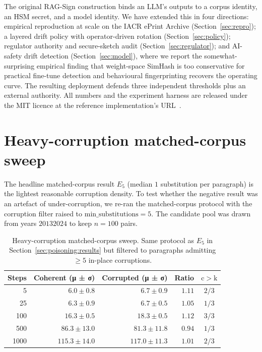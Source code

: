 \documentclass[11pt,a4paper]{article}
\begin{document}
The original RAG\nobreakdash-Sign construction \cite{holmes2025ragsign}
binds an LLM's outputs to a corpus identity, an HSM secret, and a
model identity.  We have extended this in four directions:
empirical reproduction at scale on the IACR ePrint Archive
(Section~\ref{sec:repro}); a layered drift policy with operator\nobreakdash-driven
rotation (Section~\ref{sec:policy}); regulator authority and
secure\nobreakdash-sketch audit (Section~\ref{sec:regulator}); and
AI\nobreakdash-safety drift detection (Section~\ref{sec:model}),
where we report the somewhat\nobreakdash-surprising empirical finding
that weight\nobreakdash-space SimHash is too conservative for
practical fine\nobreakdash-tune detection and behavioural
fingerprinting recovers the operating curve.  The resulting
deployment defends three independent thresholds plus an external
authority.  All numbers and the experiment harness are released
under the MIT licence at the reference
implementation's URL~\cite{ragsign-impl}.

\appendix

\section{Heavy-corruption matched-corpus sweep}
\label{app:poisoning-heavy}

The headline matched\nobreakdash-corpus result $E_5$ (median $1$
substitution per paragraph) is the lightest reasonable corruption
density.  To test whether the negative result was an artefact of
under\nobreakdash-corruption, we re\nobreakdash-ran the matched\nobreakdash-corpus
protocol with the corruption filter raised to
$\mathrm{min\_substitutions} = 5$.  The candidate pool was drawn
from years $2013$\textendash$2024$ to keep $n = 100$ pairs.

\begin{table}[h]
  \centering
  \caption{Heavy\nobreakdash-corruption matched\nobreakdash-corpus
    sweep.  Same protocol as $E_5$ in
    Section~\ref{sec:poisoning:results} but filtered to paragraphs
    admitting $\geq 5$ in\nobreakdash-place corruptions.}
  \label{tab:poisoning-heavy}
  \begin{tabular}{r r r r c}
    \toprule
    \textbf{Steps} & \textbf{Coherent (μ ± σ)} & \textbf{Corrupted (μ ± σ)} & \textbf{Ratio} & \textbf{$\mathrm{c}>\mathrm{k}$} \\
    \midrule
       5 &   $6.0 \pm 0.8$ &   $6.7 \pm 0.9$ & $1.11$ & $2/3$ \\
      25 &   $6.3 \pm 0.9$ &   $6.7 \pm 0.5$ & $1.05$ & $1/3$ \\
     100 &  $16.3 \pm 0.5$ &  $18.3 \pm 0.5$ & $1.12$ & $3/3$ \\
     500 &  $86.3 \pm 13.0$ & $81.3 \pm 11.8$ & $0.94$ & $1/3$ \\
    1000 & $115.3 \pm 14.0$ & $117.0 \pm 11.3$ & $1.01$ & $2/3$ \\
    \bottomrule
  \end{tabular}
\end{table}
\end{document}
